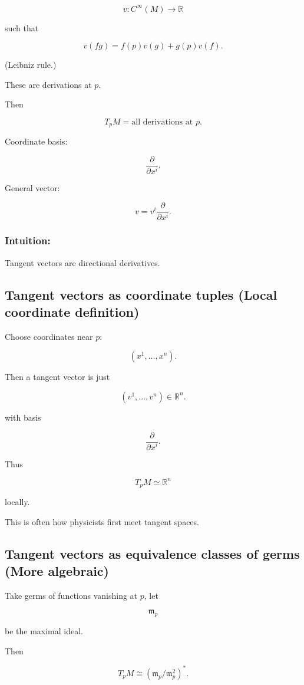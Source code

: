 \documentclass[aps,prl,twocolumn,groupedaddress]{revtex4-2}
\begin{document}
$$
v:C^\infty(M)\to \mathbb R
$$

such that

$$
v(fg)
=
f(p)v(g)+g(p)v(f).
$$

(Leibniz rule.)

These are derivations at $p$.

Then

$$
T_pM
=
{\text{all derivations at }p}.
$$

Coordinate basis:

$$
\frac{\partial}{\partial x^i}.
$$

General vector:

$$
v=v^i \frac{\partial}{\partial x^i}.
$$

\subsubsection{Intuition:}

Tangent vectors are directional derivatives.

\subsection{Tangent vectors as coordinate tuples (Local coordinate definition)}

Choose coordinates near $p$:

$$
(x^1,\dots,x^n).
$$

Then a tangent vector is just

$$
(v^1,\dots,v^n)\in \mathbb R^n.
$$

with basis

$$
\frac{\partial}{\partial x^i}.
$$

Thus

$$
T_pM\simeq \mathbb R^n
$$

locally.

This is often how physicists first meet tangent spaces.

\subsection{Tangent vectors as equivalence classes of germs (More algebraic)}

Take germs of functions vanishing at $p$, let

$$
\mathfrak m_p
$$

be the maximal ideal.

Then

$$
T_pM
\cong
(\mathfrak m_p/\mathfrak m_p^2)^*.
$$
\end{document}
